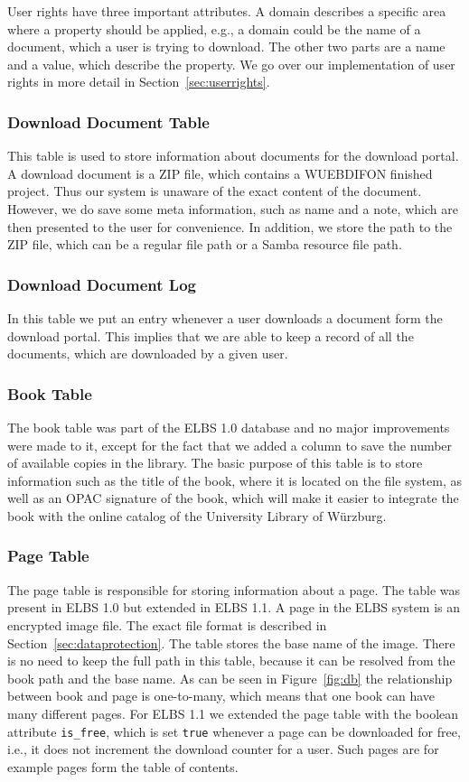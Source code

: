 User rights have three important attributes. A domain describes a specific area where a property should be applied, e.g., a domain could be the name of a document, which a user is trying to download. The other two parts are a name and a value, which describe the property. We go over our implementation of user rights in more detail in 
Section~\ref{sec:userrights}. 

\subsubsection{Download Document Table}
This table is used to store information about documents for the download portal. A download document is a ZIP file, which contains a WUEBDIFON finished project. Thus our system is unaware of the exact content of the document. However, we do save some meta information, such as name and a note, which are then presented to the user for convenience. In addition, we store the path to the ZIP file, which can be a regular file path or a Samba resource file path.   

\subsubsection{Download Document Log}
In this table we put an entry whenever a user downloads a document form the download portal. This implies that we are able to keep a record of all the documents, which are downloaded by a given user.   

\subsubsection{Book Table}
The book table was part of the ELBS 1.0 database and no major improvements were made to it, except for the fact that 
we added a column to save the number of available copies in the library. The basic purpose of this table is to store information such as the title of the book, where it is located on the file system, as well as an OPAC signature of the book, which will make it easier to integrate the book with the online catalog of the University Library of W\"urzburg.  

\subsubsection{Page Table}
The page table is responsible for storing information about a page. The table was present in ELBS 1.0 but extended in ELBS 1.1. A page in the ELBS system is an encrypted image file. The exact file format is described in Section~\ref{sec:dataprotection}.  The table stores the base name of the image. There is no need to keep the full path in this table, because it can be resolved from the book path and the base name.  As can be seen in Figure~\ref{fig:db} the relationship between book and page is one-to-many, which means that one book can have many different pages. For ELBS 1.1 we extended the page table with the boolean attribute \verb=is_free=, which is set  \verb=true= whenever a page can be downloaded for free, i.e., it does not increment the download counter for a user. Such pages are for example pages form the table of contents.

